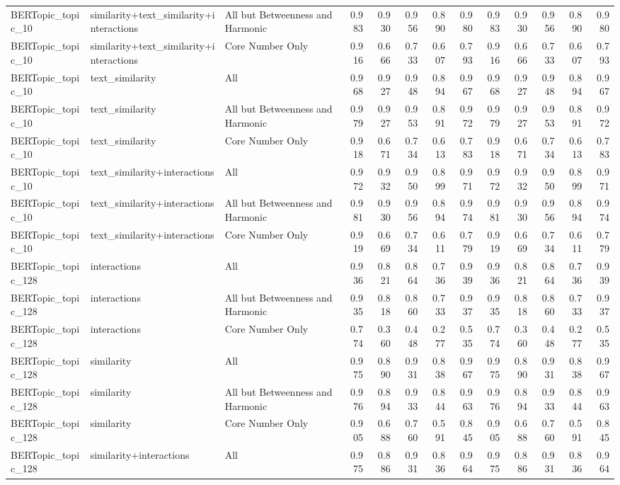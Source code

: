 \begin{tabular}{lllrrrrrrrrrr}
BERTopic_topic_10 & similarity+text_similarity+interactions & All but Betweenness and Harmonic & 0.983 & 0.930 & 0.956 & 0.890 & 0.980 & 0.983 & 0.930 & 0.956 & 0.890 & 0.980 \\
BERTopic_topic_10 & similarity+text_similarity+interactions & Core Number Only & 0.916 & 0.666 & 0.733 & 0.607 & 0.793 & 0.916 & 0.666 & 0.733 & 0.607 & 0.793 \\
BERTopic_topic_10 & text_similarity & All & 0.968 & 0.927 & 0.948 & 0.894 & 0.967 & 0.968 & 0.927 & 0.948 & 0.894 & 0.967 \\
BERTopic_topic_10 & text_similarity & All but Betweenness and Harmonic & 0.979 & 0.927 & 0.953 & 0.891 & 0.972 & 0.979 & 0.927 & 0.953 & 0.891 & 0.972 \\
BERTopic_topic_10 & text_similarity & Core Number Only & 0.918 & 0.671 & 0.734 & 0.613 & 0.783 & 0.918 & 0.671 & 0.734 & 0.613 & 0.783 \\
BERTopic_topic_10 & text_similarity+interactions & All & 0.972 & 0.932 & 0.950 & 0.899 & 0.971 & 0.972 & 0.932 & 0.950 & 0.899 & 0.971 \\
BERTopic_topic_10 & text_similarity+interactions & All but Betweenness and Harmonic & 0.981 & 0.930 & 0.956 & 0.894 & 0.974 & 0.981 & 0.930 & 0.956 & 0.894 & 0.974 \\
BERTopic_topic_10 & text_similarity+interactions & Core Number Only & 0.919 & 0.669 & 0.734 & 0.611 & 0.779 & 0.919 & 0.669 & 0.734 & 0.611 & 0.779 \\
BERTopic_topic_128 & interactions & All & 0.936 & 0.821 & 0.864 & 0.736 & 0.939 & 0.936 & 0.821 & 0.864 & 0.736 & 0.939 \\
BERTopic_topic_128 & interactions & All but Betweenness and Harmonic & 0.935 & 0.818 & 0.860 & 0.733 & 0.937 & 0.935 & 0.818 & 0.860 & 0.733 & 0.937 \\
BERTopic_topic_128 & interactions & Core Number Only & 0.774 & 0.360 & 0.448 & 0.277 & 0.535 & 0.774 & 0.360 & 0.448 & 0.277 & 0.535 \\
BERTopic_topic_128 & similarity & All & 0.975 & 0.890 & 0.931 & 0.838 & 0.967 & 0.975 & 0.890 & 0.931 & 0.838 & 0.967 \\
BERTopic_topic_128 & similarity & All but Betweenness and Harmonic & 0.976 & 0.894 & 0.933 & 0.844 & 0.963 & 0.976 & 0.894 & 0.933 & 0.844 & 0.963 \\
BERTopic_topic_128 & similarity & Core Number Only & 0.905 & 0.688 & 0.760 & 0.591 & 0.845 & 0.905 & 0.688 & 0.760 & 0.591 & 0.845 \\
BERTopic_topic_128 & similarity+interactions & All & 0.975 & 0.886 & 0.931 & 0.836 & 0.964 & 0.975 & 0.886 & 0.931 & 0.836 & 0.964 \\

\end{tabular}
